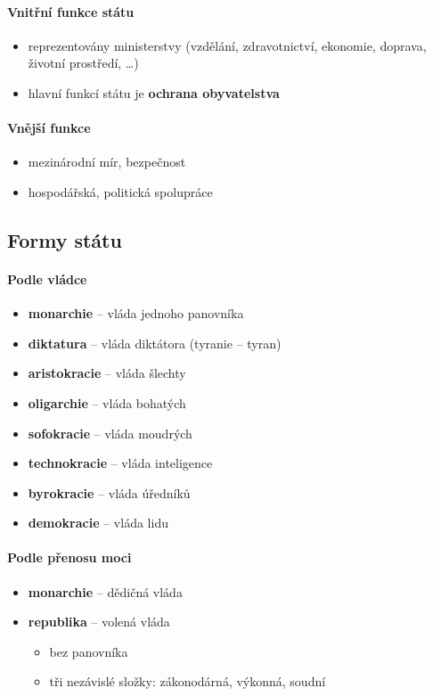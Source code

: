 \paragraph{Vnitřní funkce státu}
\begin{itemize}
\item reprezentovány ministerstvy (vzdělání, zdravotnictví, ekonomie, doprava, životní prostředí, \ldots)
\item hlavní funkcí státu je \textbf{ochrana obyvatelstva}
\end{itemize}

\paragraph{Vnější funkce}
\begin{itemize}
\item mezinárodní mír, bezpečnost
\item hospodářská, politická spolupráce
\end{itemize}


\subsection{Formy státu}
\paragraph{Podle vládce}
\begin{itemize}
\item \textbf{monarchie} -- vláda jednoho panovníka
\item \textbf{diktatura} -- vláda diktátora (tyranie -- tyran)
\item \textbf{aristokracie} -- vláda šlechty
\item \textbf{oligarchie} -- vláda bohatých
\item \textbf{sofokracie} -- vláda moudrých
\item \textbf{technokracie} -- vláda inteligence
\item \textbf{byrokracie} -- vláda úředníků
\item \textbf{demokracie} -- vláda lidu
\end{itemize}

\paragraph{Podle přenosu moci}
\begin{itemize}
\item \textbf{monarchie} -- dědičná vláda
\item \textbf{republika} -- volená vláda
	\begin{itemize}
	\item bez panovníka
	\item tři nezávislé složky: zákonodárná, výkonná, soudní
	\end{itemize}
\end{itemize}

